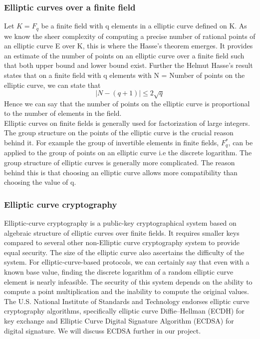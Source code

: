 \documentclass{report}
\begin{document}
\subsubsection{Elliptic curves over a finite field}
Let $K = F_q$ be a finite field with q elements in a elliptic curve defined on K. As we know the sheer complexity of computing a precise number of rational points of an elliptic curve E over K, this is where the Hasse's theorem emerges. It provides an estimate of the number of points on an elliptic curve over a finite field such that both upper bound and lower bound exist. \cite{veerman2010elliptic}
Further the Helmut Hasse's result states that on a finite field with q elements with
N = Number of points on the elliptic curve, we can state that
$$ |N-(q+1)|\leq 2{\sqrt q}$$
Hence we can say that the number of points on the elliptic curve is proportional to the number of elements in the field.\\
Elliptic curves on finite fields is generally used for factorization of large integers. The group structure on the points of the elliptic curve is the crucial reason behind it. For example the group of invertible elements in finite fields, $F^*_q$, can  be applied to the group of points on an elliptic curve i.e the discrete logarithm. The group structure of elliptic curves is generally more complicated. The reason behind this is that choosing an elliptic curve allows more compatibility than choosing the value of q. 

\subsubsection{Elliptic curve cryptography}
Elliptic-curve cryptography is a public-key cryptographical system based on algebraic structure of elliptic curves over finite fields. It requires smaller keys compared to several other non-Elliptic curve cryptography system to provide equal security. The size of the elliptic curve also ascertains the difficulty of the system. \cite{andrea}
For elliptic-curve-based protocols, we can certainly say that even with a known base value, finding the discrete logarithm of a random elliptic curve element is nearly infeasible. The security of this system depends on the ability to compute a point multiplication and the inability to compute the original values. The U.S. National Institute of Standards and Technology endorses elliptic curve cryptography algorithms, specifically elliptic curve Diffie–Hellman \cite{maurer2000diffie} (ECDH) for key exchange and Elliptic Curve Digital Signature Algorithm (ECDSA) for digital signature. We will discuss ECDSA further in our project.\cite{koblitz1987elliptic}
\end{document}
